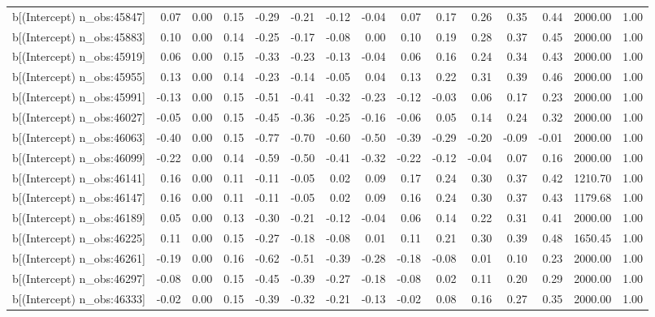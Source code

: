 \begin{table}[ht]
\begin{tabular}{rrrrrrrrrrrrrrr}
  b[(Intercept) n\_obs:45847] & 0.07 & 0.00 & 0.15 & -0.29 & -0.21 & -0.12 & -0.04 & 0.07 & 0.17 & 0.26 & 0.35 & 0.44 & 2000.00 & 1.00 \\ 
  b[(Intercept) n\_obs:45883] & 0.10 & 0.00 & 0.14 & -0.25 & -0.17 & -0.08 & 0.00 & 0.10 & 0.19 & 0.28 & 0.37 & 0.45 & 2000.00 & 1.00 \\ 
  b[(Intercept) n\_obs:45919] & 0.06 & 0.00 & 0.15 & -0.33 & -0.23 & -0.13 & -0.04 & 0.06 & 0.16 & 0.24 & 0.34 & 0.43 & 2000.00 & 1.00 \\ 
  b[(Intercept) n\_obs:45955] & 0.13 & 0.00 & 0.14 & -0.23 & -0.14 & -0.05 & 0.04 & 0.13 & 0.22 & 0.31 & 0.39 & 0.46 & 2000.00 & 1.00 \\ 
  b[(Intercept) n\_obs:45991] & -0.13 & 0.00 & 0.15 & -0.51 & -0.41 & -0.32 & -0.23 & -0.12 & -0.03 & 0.06 & 0.17 & 0.23 & 2000.00 & 1.00 \\ 
  b[(Intercept) n\_obs:46027] & -0.05 & 0.00 & 0.15 & -0.45 & -0.36 & -0.25 & -0.16 & -0.06 & 0.05 & 0.14 & 0.24 & 0.32 & 2000.00 & 1.00 \\ 
  b[(Intercept) n\_obs:46063] & -0.40 & 0.00 & 0.15 & -0.77 & -0.70 & -0.60 & -0.50 & -0.39 & -0.29 & -0.20 & -0.09 & -0.01 & 2000.00 & 1.00 \\ 
  b[(Intercept) n\_obs:46099] & -0.22 & 0.00 & 0.14 & -0.59 & -0.50 & -0.41 & -0.32 & -0.22 & -0.12 & -0.04 & 0.07 & 0.16 & 2000.00 & 1.00 \\ 
  b[(Intercept) n\_obs:46141] & 0.16 & 0.00 & 0.11 & -0.11 & -0.05 & 0.02 & 0.09 & 0.17 & 0.24 & 0.30 & 0.37 & 0.42 & 1210.70 & 1.00 \\ 
  b[(Intercept) n\_obs:46147] & 0.16 & 0.00 & 0.11 & -0.11 & -0.05 & 0.02 & 0.09 & 0.16 & 0.24 & 0.30 & 0.37 & 0.43 & 1179.68 & 1.00 \\ 
  b[(Intercept) n\_obs:46189] & 0.05 & 0.00 & 0.13 & -0.30 & -0.21 & -0.12 & -0.04 & 0.06 & 0.14 & 0.22 & 0.31 & 0.41 & 2000.00 & 1.00 \\ 
  b[(Intercept) n\_obs:46225] & 0.11 & 0.00 & 0.15 & -0.27 & -0.18 & -0.08 & 0.01 & 0.11 & 0.21 & 0.30 & 0.39 & 0.48 & 1650.45 & 1.00 \\ 
  b[(Intercept) n\_obs:46261] & -0.19 & 0.00 & 0.16 & -0.62 & -0.51 & -0.39 & -0.28 & -0.18 & -0.08 & 0.01 & 0.10 & 0.23 & 2000.00 & 1.00 \\ 
  b[(Intercept) n\_obs:46297] & -0.08 & 0.00 & 0.15 & -0.45 & -0.39 & -0.27 & -0.18 & -0.08 & 0.02 & 0.11 & 0.20 & 0.29 & 2000.00 & 1.00 \\ 
  b[(Intercept) n\_obs:46333] & -0.02 & 0.00 & 0.15 & -0.39 & -0.32 & -0.21 & -0.13 & -0.02 & 0.08 & 0.16 & 0.27 & 0.35 & 2000.00 & 1.00 \\ 

\end{tabular}
\end{table}
